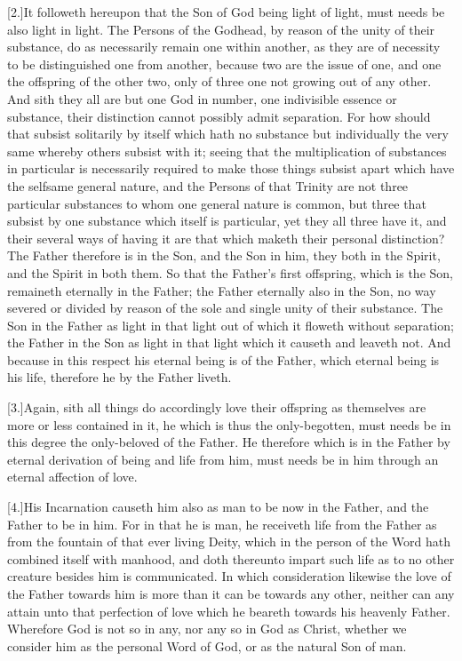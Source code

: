 [2.]It followeth hereupon that the Son of God being light of light, must needs be also light in light. The Persons of the Godhead, by reason of the unity of their substance, do as necessarily remain one within another, as they are of necessity to be distinguished one from another, because two are the issue of one, and one the offspring of the other two, only of three one not growing out of any other. And sith they all are but one God in number, one indivisible essence or substance, their distinction cannot possibly admit separation. For how should that subsist solitarily by itself which hath no substance but individually the very same whereby others subsist with it; seeing that the multiplication of substances in particular is necessarily required to make those things subsist apart which have the selfsame general nature, and the Persons of that Trinity are not three particular substances to whom one general nature is common, but three that subsist by one substance which itself is particular, yet they all three have it, and their several ways of having it are that which maketh their personal distinction? The Father therefore is in the Son, and the Son in him, they both in the Spirit, and the Spirit in both them. So that the Father’s first offspring, which is the Son, remaineth eternally in the Father; the Father eternally also in the Son, no way severed or divided by reason of the sole and single unity of their substance. The Son in the Father as light in that light out of which it floweth without separation; the Father in the Son as light in that light which it causeth and leaveth not. And because in this respect his eternal being is of the Father, which eternal being is his life, therefore he by the Father liveth.

[3.]Again, sith all things do accordingly love their offspring as themselves are more or less contained in it, he which  is thus the only-begotten, must needs be in this degree the only-beloved of the Father.
 He therefore which is in the Father by eternal derivation of being and life from him, must needs be in him through an eternal affection of love.

[4.]His Incarnation causeth him also as man to be now in the Father, and the Father to be in him. For in that he is man, he receiveth life from the Father as from the fountain of that ever living Deity, which in the person of the Word hath combined itself with manhood, and doth thereunto impart such life as to no other creature besides him is communicated. In which consideration likewise the love of the Father towards him is more than it can be towards any other, neither can any attain unto that perfection of love which he beareth towards his heavenly Father. Wherefore God is not so in any, nor any so in God as Christ, whether we consider him as the personal Word of God, or as the natural Son of man.

